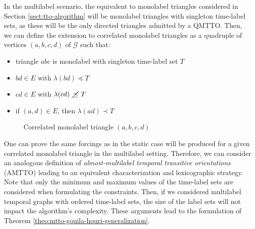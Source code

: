 \documentclass[runningheads]{llncs}
\begin{document}
In the multilabel scenario, the equivalent to monolabel triangles considered in Section \ref{sect:tto-algorithm} will be monolabel triangles with singleton time-label sets, as these will be the only directed triangles admitted by a QMTTO. Then, we can define the extension to correlated monolabel triangles as a quadruple of vertices $(a,b,c,d)$ of $\mathcal{G}$ such that:

\begin{itemize}
    \item triangle $abc$ is monolabel with singleton time-label set $T$
    \item $bd \in E$ with $\lambda(bd)\preceq T$ 
    \item $cd \in E$ with $\lambda(cd) \hspace{1ex} \cancel{\preceq} \hspace{1ex} T$
    \item if $(a,d) \in E$, then $\lambda(ad) \prec T$
\end{itemize}

\begin{figure}[H]
\begin{center}
\end{center}
\caption{Correlated monolabel triangle $(a,b,c,d)$}
\label{fig:bad-quadruple-mtto}
\end{figure}

One can prove the same forcings as in the static case will be produced for a given correlated monolabel triangle in the multilabel setting. Therefore, we can consider an analogous definition of \emph{almost-multilabel temporal transitive orientations} (AMTTO) leading to an equivalent characterization and lexicographic strategy. Note that only the minimum and maximum values of the time-label sets are considered when formulating the constraints. Then, if we considered multilabel temporal graphs with ordered time-label sets, the size of the label sets will not impact the algorithm's complexity. These arguments lead to the formulation of Theorem \ref{theo:mtto-gouila-houri-generalization}.
\end{document}
